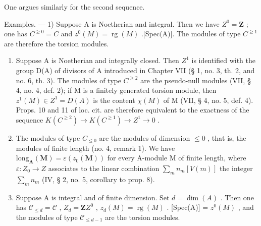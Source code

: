 One argues similarly for the second sequence.

Examples. --- 1) Suppose A is Noetherian and integral. Then we have \(Z^0 = \mathbf{Z}\){}{} ; one has \(C^{\geqslant 0} = C\) and \(z^0(M) = \operatorname{rg}(M)\) .[Spec(A)]. The modules of type \(C^{\geqslant 1}\) are therefore the torsion modules.

\begin{enumerate}
\def\labelenumi{\arabic{enumi})}
\setcounter{enumi}{1}
\item
  Suppose A is Noetherian and integrally closed. Then \(Z^1\) is identified with the group D(A) of divisors of A introduced in Chapter VII (§ 1, no. 3, th. 2, and no. 6, th. 3). The modules of type \(C^{\geqslant 2}\) are the pseudo-null modules (VII, § 4, no. 4, def. 2); if M is a finitely generated torsion module, then \(z^1(M) \in Z^1 = D(A)\) is the content \(\chi(M)\) of M (VII, § 4, no. 5, def. 4). Props. 10 and 11 of loc. cit. are therefore equivalent to the exactness of the sequence \(K(C^{\geqslant 2}) \to K(C^{\geqslant 1}) \to Z^1 \to 0\) .
\item
  The modules of type \(C_{\leqslant0}\) are the modules of dimension \(\leqslant0\) , that is, the modules of finite length (no. 4, remark 1). We have \(\text{long}_{\mathbf{A}}(\mathbf{M}) = \varepsilon(z_0(\mathbf{M}))\) for every A-module M of finite length, where \(\varepsilon: Z_0 \to Z\) associates to the linear combination \(\sum_{m} n_{m}[V(m)]\) the integer \(\sum_{m} n_{m}\) (IV, § 2, no. 5, corollary to prop. 8).
\item
  Suppose A is integral and of finite dimension. Set \(d = \dim(A)\) . Then one has \(\mathcal{C}_{\leq d} = \mathcal{C}\) , \(Z_d = \mathbf{Z}\){}{}\(Z^0\) , \(z_d(M) = \operatorname{rg}(M)\) . [Spec(A)] = \(z^0(M)\) , and the modules of type \(\mathcal{C}_{\leq d-1}\) are the torsion modules.
\end{enumerate}

